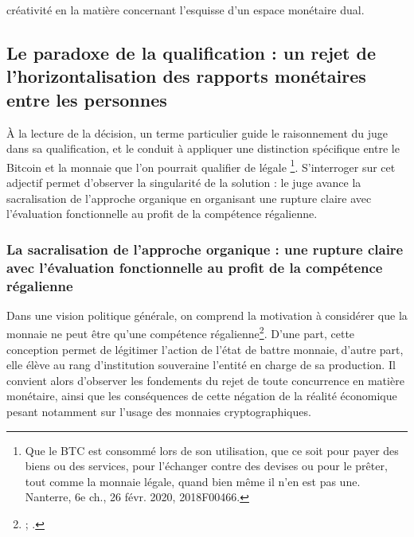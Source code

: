 {créativité en la matière concernant l'esquisse d'un espace monétaire dual.\par

\subsection{Le paradoxe de la qualification : un rejet de l'horizontalisation des rapports monétaires entre les personnes}

À la lecture de la décision, un terme particulier guide le raisonnement du juge dans sa qualification, et le conduit à appliquer une distinction spécifique entre le Bitcoin et la monnaie que l'on pourrait qualifier de \og légale \fg{}\footnote{\og Que le BTC est \og consommé \fg{} lors de son utilisation, que ce soit pour payer des biens ou des services, pour l'échanger contre des devises ou pour le prêter, tout comme la monnaie légale, quand bien même il n'en est pas une\fg{}. Nanterre, 6e ch., 26 févr. 2020, \no 2018F00466.}. S'interroger sur cet adjectif permet d'observer la singularité de la solution : le juge avance la sacralisation de l'approche organique en organisant une rupture claire avec l'évaluation fonctionnelle au profit de la compétence régalienne.\par

\subsubsection{La sacralisation de l'approche organique : une rupture claire avec l'évaluation fonctionnelle au profit de la compétence régalienne}

Dans une vision politique générale, on comprend la motivation à considérer que la monnaie ne peut être qu'une compétence régalienne\footnote{ ; .}. D'une part, cette conception permet de légitimer l'action de l'état de battre monnaie, d'autre part, elle élève au rang d'institution souveraine l'entité en charge de sa production. Il convient alors d'observer les fondements du rejet de toute concurrence en matière monétaire, ainsi que les conséquences de cette négation de la réalité économique pesant notamment sur l'usage des monnaies cryptographiques.\par

}
